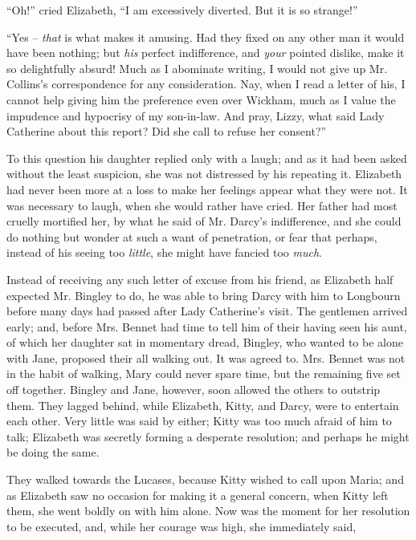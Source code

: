 “Oh!” cried Elizabeth, “I am excessively diverted.
But it is so strange!”

“Yes -- \textit{that} is what makes it amusing. Had they fixed
on any other man it would have been nothing; but \textit{his}
perfect indifference, and \textit{your} pointed dislike, make it so
delightfully absurd! Much as I abominate writing, I would
not give up Mr. Collins’s correspondence for any consideration.
Nay, when I read a letter of his, I cannot
help giving him the preference even over Wickham, much
as I value the impudence and hypocrisy of my son-in-law.
And pray, Lizzy, what said Lady Catherine about this
report? Did she call to refuse her consent?”

To this question his daughter replied only with a laugh;
and as it had been asked without the least suspicion, she
was not distressed by his repeating it. Elizabeth had
never been more at a loss to make her feelings appear
what they were not. It was necessary to laugh, when
she would rather have cried. Her father had most cruelly
mortified her, by what he said of Mr. Darcy’s indifference,
and she could do nothing but wonder at such a want of
penetration, or fear that perhaps, instead of his seeing
too \textit{little}, she might have fancied too \textit{much}.


Instead of receiving any such letter of excuse from his
friend, as Elizabeth half expected Mr. Bingley to do, he
was able to bring Darcy with him to Longbourn before
many days had passed after Lady Catherine’s visit. The
gentlemen arrived early; and, before Mrs. Bennet had
time to tell him of their having seen his aunt, of which
her daughter sat in momentary dread, Bingley, who
wanted to be alone with Jane, proposed their all walking
out. It was agreed to. Mrs. Bennet was not in the habit
of walking, Mary could never spare time, but the remaining
five set off together. Bingley and Jane, however, soon
allowed the others to outstrip them. They lagged behind,
while Elizabeth, Kitty, and Darcy, were to entertain each
other. Very little was said by either; Kitty was too
much afraid of him to talk; Elizabeth was secretly
forming a desperate resolution; and perhaps he might be
doing the same.

They walked towards the Lucases, because Kitty wished
to call upon Maria; and as Elizabeth saw no occasion
for making it a general concern, when Kitty left them, she
went boldly on with him alone. Now was the moment
for her resolution to be executed, and, while her courage
was high, she immediately said,

